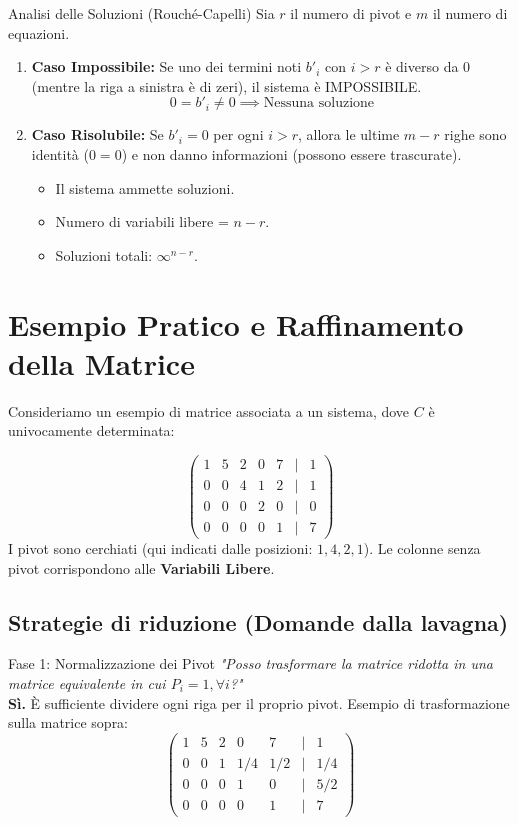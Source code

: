 \begin{concept}{Analisi delle Soluzioni (Rouché-Capelli)}{}
Sia $r$ il numero di pivot e $m$ il numero di equazioni.
\begin{enumerate}
    \item \textbf{Caso Impossibile:} Se uno dei termini noti $b'_i$ con $i > r$ è diverso da $0$ (mentre la riga a sinistra è di zeri), il sistema è IMPOSSIBILE.
    \[ 0 = b'_i \neq 0 \implies \text{Nessuna soluzione} \]
    
    \item \textbf{Caso Risolubile:} Se $b'_i = 0$ per ogni $i > r$, allora le ultime $m-r$ righe sono identità ($0=0$) e non danno informazioni (possono essere trascurate).
    \begin{itemize}
        \item Il sistema ammette soluzioni.
        \item Numero di variabili libere = $n - r$.
        \item Soluzioni totali: $\infty^{n-r}$.
    \end{itemize}
\end{enumerate}
\end{concept}

\section{Esempio Pratico e Raffinamento della Matrice}

Consideriamo un esempio di matrice associata a un sistema, dove $C$ è univocamente determinata:

\[
\begin{pmatrix}
1 & 5 & 2 & 0 & 7 & | & 1 \\
0 & 0 & 4 & 1 & 2 & | & 1 \\
0 & 0 & 0 & 2 & 0 & | & 0 \\
0 & 0 & 0 & 0 & 1 & | & 7
\end{pmatrix}
\]
I pivot sono cerchiati (qui indicati dalle posizioni: $1, 4, 2, 1$).
Le colonne senza pivot corrispondono alle \textbf{Variabili Libere}.

\subsection{Strategie di riduzione (Domande dalla lavagna)}

\begin{observation}{Fase 1: Normalizzazione dei Pivot}{}
\textit{"Posso trasformare la matrice ridotta in una matrice equivalente in cui $P_i = 1, \forall i$?"} \\
\textbf{Sì.} È sufficiente dividere ogni riga per il proprio pivot.
Esempio di trasformazione sulla matrice sopra:
\[
\begin{pmatrix}
1 & 5 & 2 & 0 & 7 & | & 1 \\
0 & 0 & 1 & 1/4 & 1/2 & | & 1/4 \\
0 & 0 & 0 & 1 & 0 & | & 5/2 \\
0 & 0 & 0 & 0 & 1 & | & 7
\end{pmatrix}
\]
\end{observation}

